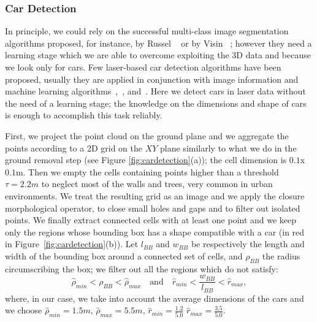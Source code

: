 \subsubsection{Car Detection}
In principle, we could rely on the successful multi-class image segmentation algorithms proposed, for instance, by Russel \etal~\cite{russell2009associative} or by Visin \etal~\cite{visin2016reseg}; however they need a learning stage which we are able to overcome exploiting the 3D data and because we look only for cars.
Few laser-based car detection algorithms have been proposed, usually they are applied in conjunction with image information and machine learning algorithms~\cite{wender20083d},~\cite{zhang2014vehicle}, and~\cite{premebida2007lidar}.
Here we detect cars in laser data without the need of a learning stage; the knowledge on the dimensions and shape of cars is enough to accomplish this task reliably.

First, we project the point cloud on the ground plane and we aggregate the points according to a 2D grid on the $XY$ plane similarly to what we do in the ground removal step (see Figure \ref{fig:cardetection}(a)); the cell dimension is $0.1$x$0.1$m.
Then we empty the cells containing points higher than a threshold $\tau=2.2m$ to neglect most of the walls and trees, very common in urban environments.
We treat the resulting grid as an image and we apply the closure morphological operator, to close small holes and gaps and to filter out isolated points.
We finally extract connected cells with at least one point and we keep only the regions whose bounding box has a shape compatible with a car (in red in Figure~\ref{fig:cardetection}(b)). 
Let $l_{BB}$ and $w_{BB}$ be respectively the length and width of the bounding box around a connected set of cells, and $\rho_{BB}$ the radius circumscribing the box; we filter out all the regions which do not satisfy:
\begin{equation}
 \hat{\rho}_{min} < \rho_{BB} < \hat{\rho}_{max} \quad \text{and} \quad  \hat{r}_{min} < \frac{w_{BB}}{l_{BB}}< \hat{r}_{max},
\end{equation}
where, in our case, we take into account the average dimensions of the cars and we choose $\hat{\rho}_{min} = 1.5m$, $\hat{\rho}_{max}=5.5m$,  $\hat{r}_{min} =\frac{1.2}{5.0}$ $\hat{r}_{max} = \frac{3.5}{5.0}$.

